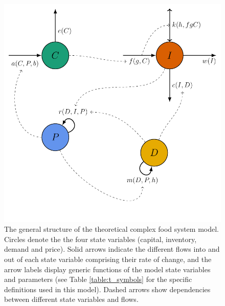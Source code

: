 \documentclass[9pt,twocolumn,twoside,lineno]{pnas-new}
\begin{document}
\begin{figure}
  \centering
  \includegraphics[scale=0.5]{figure_1.pdf}
  \caption{The general structure of the theoretical complex food system model. Circles denote the the four state variables (capital, inventory, demand and price). Solid arrows indicate the different flows into and out of each state variable comprising their rate of change, and the arrow labels display generic functions of the model state variables and parameters (see Table \ref{table:t_symbols} for the specific definitions used in this model). Dashed arrows show dependencies between different state variables and flows.}
  \label{fig:fig_cfs}
\end{figure}
\end{document}
